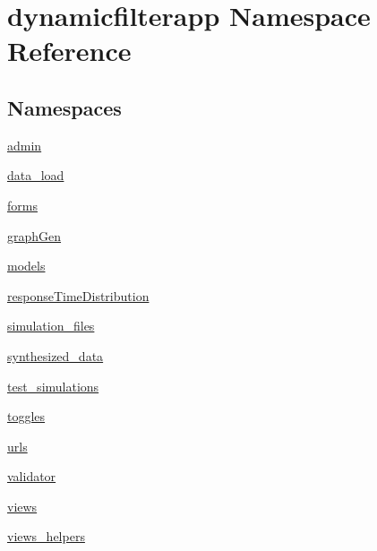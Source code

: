 \hypertarget{namespacedynamicfilterapp}{}\section{dynamicfilterapp Namespace Reference}
\label{namespacedynamicfilterapp}
\subsection*{Namespaces}
\begin{DoxyCompactItemize}
\item 
 \mbox{\hyperlink{namespacedynamicfilterapp_1_1admin}{admin}}
\item 
 \mbox{\hyperlink{namespacedynamicfilterapp_1_1data__load}{data\+\_\+load}}
\item 
 \mbox{\hyperlink{namespacedynamicfilterapp_1_1forms}{forms}}
\item 
 \mbox{\hyperlink{namespacedynamicfilterapp_1_1graph_gen}{graph\+Gen}}
\item 
 \mbox{\hyperlink{namespacedynamicfilterapp_1_1models}{models}}
\item 
 \mbox{\hyperlink{namespacedynamicfilterapp_1_1response_time_distribution}{response\+Time\+Distribution}}
\item 
 \mbox{\hyperlink{namespacedynamicfilterapp_1_1simulation__files}{simulation\+\_\+files}}
\item 
 \mbox{\hyperlink{namespacedynamicfilterapp_1_1synthesized__data}{synthesized\+\_\+data}}
\item 
 \mbox{\hyperlink{namespacedynamicfilterapp_1_1test__simulations}{test\+\_\+simulations}}
\item 
 \mbox{\hyperlink{namespacedynamicfilterapp_1_1toggles}{toggles}}
\item 
 \mbox{\hyperlink{namespacedynamicfilterapp_1_1urls}{urls}}
\item 
 \mbox{\hyperlink{namespacedynamicfilterapp_1_1validator}{validator}}
\item 
 \mbox{\hyperlink{namespacedynamicfilterapp_1_1views}{views}}
\item 
 \mbox{\hyperlink{namespacedynamicfilterapp_1_1views__helpers}{views\+\_\+helpers}}
\end{DoxyCompactItemize}
